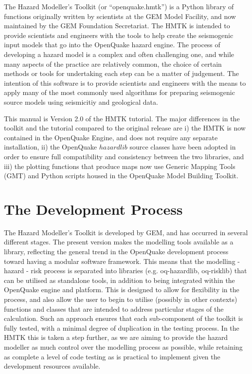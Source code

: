 The Hazard Modeller's Toolkit (or ``openquake.hmtk'') is a Python library of functions originally written by scientists at the GEM Model Facility, and now maintained by the GEM Foundation Secretariat. The HMTK is intended to provide 
scientists and engineers with the tools to help create the seismogenic 
input models that go into the OpenQuake hazard engine. The process of 
developing a hazard model is a complex and often challenging 
one, and while many aspects of the practice are relatively common, the 
choice of certain methods or tools for undertaking each step can be a 
matter of judgement. The intention of this software is to provide 
scientists and engineers with the means to apply many of the most 
commonly used algorithms for preparing seismogenic source models 
using seismicitiy and geological data. 

This manual is Version 2.0 of the HMTK tutorial. The major differences in the toolkit and the tutorial compared to the original release are i) the HMTK is now contained in the OpenQuake Engine, and does not require any separate installation, ii) the OpenQuake $hazardlib$ source classes have been adopted in order to ensure full compatibility and consistency between the two libraries, and iii) the plotting functions that produce maps now use Generic Mapping Tools (GMT) and Python scripts housed in the OpenQuake Model Building Toolkit. 


\section{The Development Process}

The Hazard Modeller's Toolkit is developed by GEM, and has occurred in several different stages. The present version makes the modelling tools available as a library, reflecting the general trend in the OpenQuake development process toward having a modular software framework. This means that the modelling - hazard - risk process is separated into libraries (e.g. oq-hazardlib, oq-risklib) that can be utilised as standalone tools, in addition to being integrated within the OpenQuake engine and platform. This is designed to allow for flexibility in the process, and also allow the user to begin to utilise (possibly in other contexts) functions and classes that are intended to address particular stages of the calculation. Such an approach ensures that each sub-component of the toolkit is fully tested, with a minimal degree of duplication in the testing process. In the HMTK this is taken a step further, as we are aiming to provide the hazard modeller as much control over the modelling process as possible, while retaining as complete a level of code testing as is practical to implement given the development resources available. 

